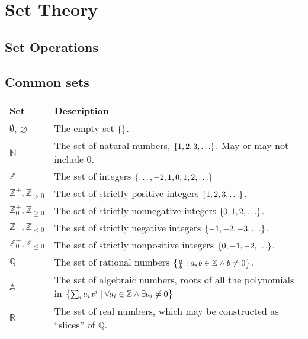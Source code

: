 \documentclass[a4paper,11pt]{article}
\begin{document}
    \section{Set Theory}

    \subsection{Set Operations}

    \subsection{Common sets}


    \begin{longtable}{ll}
    \toprule
    \bfseries Set & \bfseries Description \\
    \midrule
    \endhead
    $\emptyset$, $\varnothing$ & The empty set $\set{}$. \\
    $\mathbb{N}$ & The set of natural numbers, $\set{1, 2, 3, \ldots}$.
                   May or may not include $0$. \\
    $\mathbb{Z}$ & The set of integers $\set{\ldots, -2, 1, 0, 1, 2, \ldots}$ \\
    $\mathbb{Z}^+, \mathbb{Z}_{> 0}$ & The set of strictly positive integers
                   $\set{1, 2, 3, \ldots}$. \\
    $\mathbb{Z}^+_0, \mathbb{Z}_{\ge 0}$ &
                   The set of strictly nonnegative integers
                   $\set{0, 1, 2, \ldots}$. \\
    $\mathbb{Z}^-, \mathbb{Z}_{< 0}$ & The set of strictly negative integers
                   $\set{-1, -2, -3, \ldots}$. \\
    $\mathbb{Z}^-_0, \mathbb{Z}_{\le 0}$ &
                   The set of strictly nonpositive integers
                   $\set{0, -1, -2, \ldots}$. \\
    $\mathbb{Q}$ & The set of rational numbers
                   $\set{\frac ab \mid a, b \in \mathbb{Z} \land b \neq 0}$.\\
    $\mathbb{A}$ & The set of algebraic numbers, roots of all the polynomials in
                   $\set{\sum_i a_i x^i \mid \forall a_i \in \mathbb{Z} \land
                         \exists a_i \neq 0}$ \\
    $\mathbb{R}$ & The set of real numbers, which may be constructed as
                   ``slices'' of $\mathbb{Q}$. \\

\end{longtable}
\end{document}
